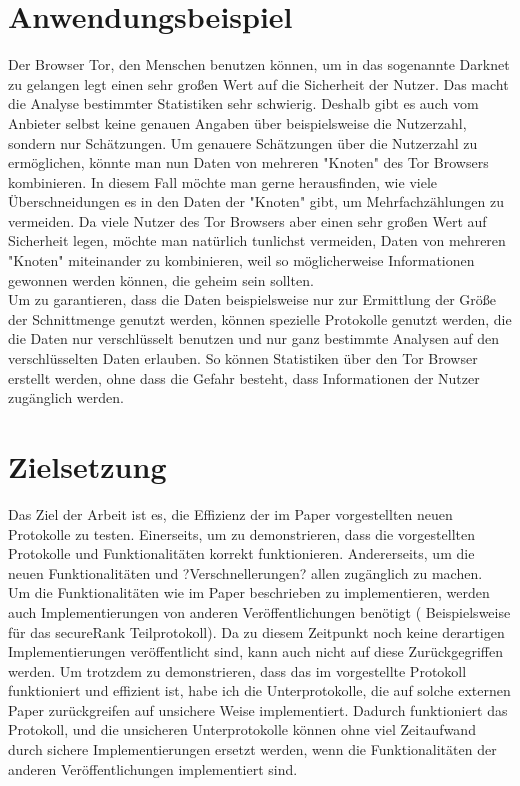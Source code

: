 \section{Anwendungsbeispiel}
Der Browser Tor, den Menschen benutzen können, um in das sogenannte Darknet zu gelangen legt einen sehr großen Wert auf die Sicherheit der Nutzer. Das macht die Analyse bestimmter Statistiken sehr schwierig. Deshalb gibt es auch vom Anbieter selbst keine genauen Angaben über beispielsweise die Nutzerzahl, sondern nur Schätzungen. Um genauere Schätzungen über die Nutzerzahl zu ermöglichen, könnte man nun Daten von mehreren "Knoten" des Tor Browsers kombinieren. In diesem Fall möchte man gerne herausfinden, wie viele Überschneidungen es in den Daten der "Knoten" gibt, um Mehrfachzählungen zu vermeiden. Da viele Nutzer des Tor Browsers aber einen sehr großen Wert auf Sicherheit legen, möchte man natürlich tunlichst vermeiden, Daten von mehreren "Knoten" miteinander zu kombinieren, weil so möglicherweise Informationen gewonnen werden können, die geheim sein sollten.\\
Um zu garantieren, dass die Daten beispielsweise nur zur Ermittlung der Größe der Schnittmenge genutzt werden, können spezielle Protokolle genutzt werden, die die Daten nur verschlüsselt benutzen und nur ganz bestimmte  Analysen auf den verschlüsselten Daten erlauben. So können Statistiken über den Tor Browser erstellt werden, ohne dass die Gefahr besteht, dass Informationen der Nutzer zugänglich werden.

\section{Zielsetzung}
Das Ziel der Arbeit ist es, die Effizienz der im Paper \cite{Doettling2021} vorgestellten neuen Protokolle zu testen. Einerseits, um zu demonstrieren, dass die vorgestellten Protokolle und Funktionalitäten korrekt funktionieren. Andererseits, um die neuen Funktionalitäten und ?Verschnellerungen? allen zugänglich zu machen.\\
Um die Funktionalitäten wie im Paper \cite{Doettling2021} beschrieben zu implementieren, werden auch Implementierungen von anderen Veröffentlichungen benötigt (\cite{Schoenmakers} Beispielsweise für das secureRank Teilprotokoll). Da zu diesem Zeitpunkt noch keine derartigen Implementierungen veröffentlicht sind, kann auch nicht auf diese Zurückgegriffen werden. Um trotzdem zu demonstrieren, dass das im \cite{Doettling2021} vorgestellte Protokoll funktioniert und effizient ist, habe ich die Unterprotokolle, die auf solche externen Paper zurückgreifen auf unsichere Weise implementiert. Dadurch funktioniert das Protokoll, und die unsicheren Unterprotokolle können ohne viel Zeitaufwand durch sichere Implementierungen ersetzt werden, wenn die Funktionalitäten der anderen Veröffentlichungen implementiert sind.


